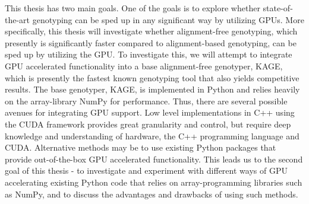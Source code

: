 This thesis has two main goals.
One of the goals is to explore whether state-of-the-art genotyping can be sped up in any significant way by utilizing GPUs.
More specifically, this thesis will investigate whether alignment-free genotyping, which presently is significantly faster compared to alignment-based genotyping, can be sped up by utilizing the GPU.
To investigate this, we will attempt to integrate GPU accelerated functionality into a base alignment-free genotyper, KAGE, which is presently the fastest known genotyping tool that also yields competitive results.
The base genotyper, KAGE, is implemented in Python and relies heavily on the array-library NumPy for performance.
Thus, there are several possible avenues for integrating GPU support. 
Low level implementations in C++ using the CUDA framework provides great granularity and control, but require deep knowledge and understanding of hardware, the C++ programming language and CUDA.
Alternative methods may be to use existing Python packages that provide out-of-the-box GPU accelerated functionality.
This leads us to the second goal of this thesis - to investigate and experiment with different ways of GPU accelerating existing Python code that relies on array-programming libraries such as NumPy, and to discuss the advantages and drawbacks of using such methods.
